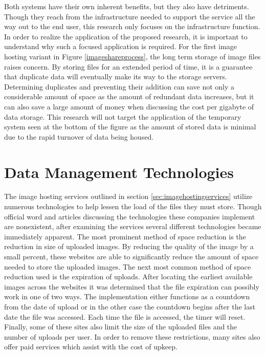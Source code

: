 Both systems have their own inherent benefits, but they also have detriments. Though they reach from the infrastructure needed to support the service all the way out to the end user, this research only focuses on the infrastructure function. In order to realize the application of the proposed research, it is important to understand why such a focused application is required. For the first image hosting variant in Figure \ref{imageshareprocess}, the long term storage of image files raises concern. By storing files for an extended period of time, it is a guarantee that duplicate data will eventually make its way to the storage servers. Determining duplicates and preventing their addition can save not only a considerable amount of space as the amount of redundant data increases, but it can also save a large amount of money when discussing the cost per gigabyte of data storage. This research will not target the application of the temporary system seen at the bottom of the figure as the amount of stored data is minimal due to the rapid turnover of data being housed.

\section{Data Management Technologies} \label{sec:datadeduptech}
The image hosting services outlined in section \ref{sec:imagehostingservices} utilize numerous technologies to help lessen the load of the files they must store. Though official word and articles discussing the technologies these companies implement are nonexistent, after examining the services several different technologies became immediately apparent. The most prominent method of space reduction is the reduction in size of uploaded images. By reducing the quality of the image by a small percent, these websites are able to significantly reduce the amount of space needed to store the uploaded images. The next most common method of space reduction used is the expiration of uploads. After locating the earliest available images across the websites it was determined that the file expiration can possibly work in one of two ways. The implementation either functions as a countdown from the date of upload or in the other case the countdown begins after the last date the file was accessed. Each time the file is accessed, the timer will reset. Finally, some of these sites also limit the size of the uploaded files and the number of uploads per user. In order to remove these restrictions, many sites also offer paid services which assist with the cost of upkeep. 

